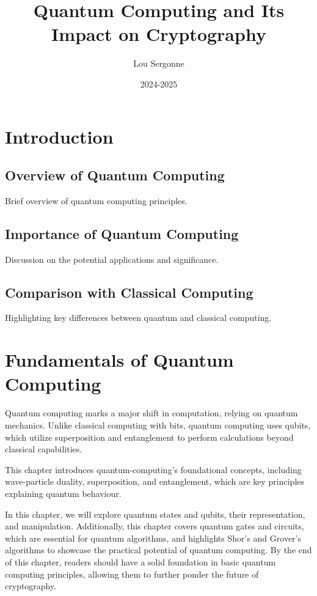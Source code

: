 \documentclass{report}
\title{Quantum Computing and Its Impact on Cryptography}
\author{Lou Sergonne}
\date{2024-2025}
\begin{document}
\maketitle
\tableofcontents

\chapter{Introduction}
\section{Overview of Quantum Computing}
Brief overview of quantum computing principles.

\section{Importance of Quantum Computing}
Discussion on the potential applications and significance.

\section{Comparison with Classical Computing}
Highlighting key differences between quantum and classical computing.


\chapter{Fundamentals of Quantum Computing}

Quantum computing marks a major shift in computation, relying on quantum mechanics. Unlike classical computing with bits, quantum computing uses qubits, which utilize superposition and entanglement to perform calculations beyond classical capabilities.

This chapter introduces quantum-computing’s foundational concepts, including wave-particle duality, superposition, and entanglement, which are key principles explaining quantum behaviour.

In this chapter, we will explore quantum states and qubits, their representation, and manipulation. Additionally, this chapter covers quantum gates and circuits, which are essential for quantum algorithms, and highlights Shor's and Grover's algorithms to showcase the practical potential of quantum computing. By the end of this chapter, readers should have a solid foundation in basic quantum computing principles, allowing them to further ponder the future of cryptography.
\end{document}
